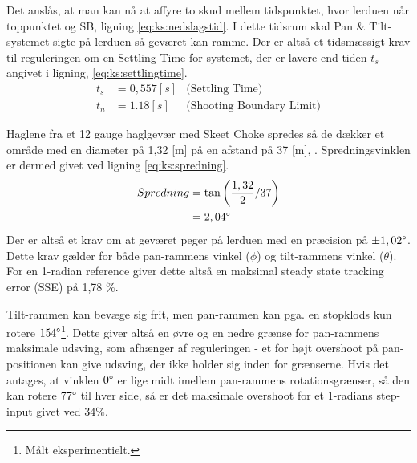 Det anslås, at man kan nå at affyre to skud mellem tidspunktet,
hvor lerduen når toppunktet og SB, ligning \ref{eq:ks:nedslagstid}.
I dette tidsrum skal Pan \& Tilt-systemet sigte på lerduen så geværet kan ramme.
Der er altså et tidsmæssigt krav til reguleringen om en Settling Time for systemet,
der er lavere end tiden \(t_{s}\) angivet i ligning, \ref{eq:ks:settlingtime}.
\begin{align}
  t_{s} &= 0,557 [s] &\text{(Settling Time)}
  \label{eq:ks:settlingtime}
\\
  t_{n} &= 1.18 [s] &\text{(Shooting Boundary Limit)}
  \label{eq:ks:nedslagstid}
\end{align}

Haglene fra et 12 gauge haglgevær med Skeet Choke spredes så de dækker et område
med en diameter på 1,32 [m] på en afstand på 37 [m], . %
Spredningsvinklen er dermed givet ved ligning \ref{eq:ks:spredning}.
\begin{align}
  Spredning &= \tan \left(\frac{1,32}{2} / 37 \right) \\
  &= 2,04 \degree
  \label{eq:ks:spredning}
\end{align}
Der er altså et krav om at geværet peger på lerduen med en præcision på \(\pm 1,02 \degree\).
Dette krav gælder for både pan-rammens vinkel (\(\phi\)) og tilt-rammens vinkel (\(\theta\)).
For en 1-radian reference giver dette altså en maksimal steady state tracking error (SSE) på 1,78 \%.

Tilt-rammen kan bevæge sig frit,
men pan-rammen kan pga. en stopklods kun rotere \(154 \degree\)\footnote{Målt eksperimentielt.}.
Dette giver altså en øvre og en nedre grænse for pan-rammens maksimale udsving,
som afhænger af reguleringen
- et for højt overshoot på pan-positionen kan give udsving, der ikke holder sig inden for grænserne.
Hvis det antages, at vinklen \(0 \degree\) er lige midt imellem pan-rammens rotationsgrænser,
så den kan rotere \(77 \degree\) til hver side, så er det maksimale overshoot for et 1-radians step-input
givet ved \(34 \%\).